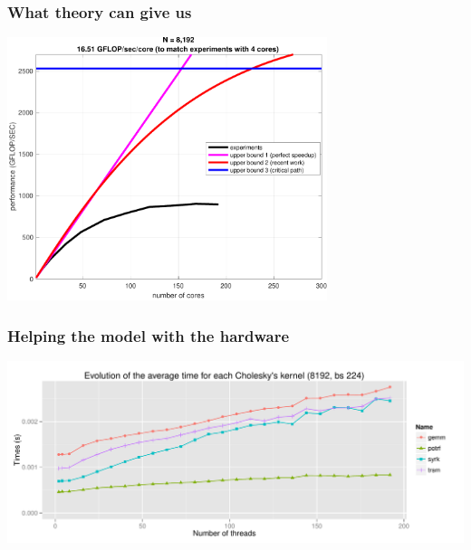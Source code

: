 \documentclass[xcolor={usenames,dvipsnames,svgnames,table}, aspectratio=43]{beamer}
\begin{document}
\begin{frame}
  \frametitle{What theory can give us}
  \begin{center}
    \includegraphics[width=0.7\textwidth]{graph/kaapi_upperbound-crop.pdf}
  \end{center}
\end{frame}

\begin{frame}
  \frametitle{Helping the model with the hardware}
  \begin{center}
    \includegraphics[width=\textwidth]{graph/graph_eval_kernels.pdf}
  \end{center}
\end{frame}
\end{document}
